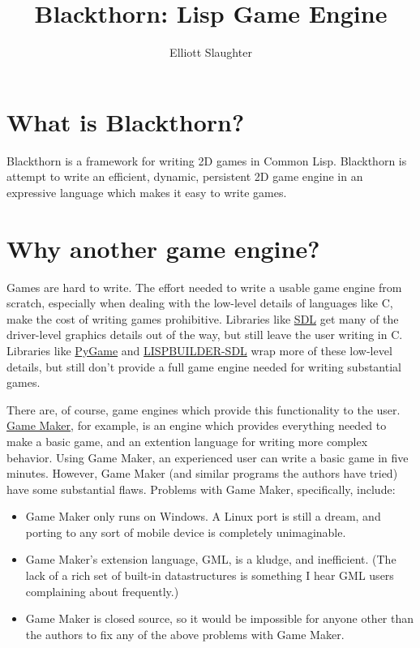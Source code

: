 \documentclass[letterpaper]{article}
\title{Blackthorn: Lisp Game Engine}
\author{Elliott Slaughter}
\begin{document}
\maketitle

\tableofcontents

\section{What is Blackthorn?}

Blackthorn is a framework for writing 2D games in Common Lisp. Blackthorn is attempt to write an efficient, dynamic, persistent 2D game engine in an expressive language which makes it easy to write games.

\section{Why another game engine?}

Games are hard to write. The effort needed to write a usable game engine from scratch, especially when dealing with the low-level details of languages like C, make the cost of writing games prohibitive. Libraries like \href{http://www.libsdl.org/}{SDL} get many of the driver-level graphics details out of the way, but still leave the user writing in C. Libraries like \href{http://www.pygame.org/news.html}{PyGame} and \href{http://code.google.com/p/lispbuilder/wiki/LispbuilderSDL}{LISPBUILDER-SDL} wrap more of these low-level details, but still don't provide a full game engine needed for writing substantial games.

There are, of course, game engines which provide this functionality to the user. \href{http://www.yoyogames.com/gamemaker/}{Game Maker}, for example, is an engine which provides everything needed to make a basic game, and an extention language for writing more complex behavior. Using Game Maker, an experienced user can write a basic game in five minutes. However, Game Maker (and similar programs the authors have tried) have some substantial flaws. Problems with Game Maker, specifically, include:

\begin{itemize}
    \item Game Maker only runs on Windows. A Linux port is still a dream, and porting to any sort of mobile device is completely unimaginable.
    \item Game Maker's extension language, GML, is a kludge, and inefficient. (The lack of a rich set of built-in datastructures is something I hear GML users complaining about frequently.)
    \item Game Maker is closed source, so it would be impossible for anyone other than the authors to fix any of the above problems with Game Maker.
\end{itemize}
\end{document}

